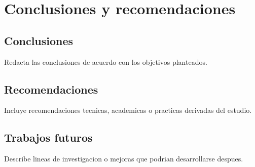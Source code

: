 \chapter{Conclusiones y recomendaciones}

\section{Conclusiones}
Redacta las conclusiones de acuerdo con los objetivos planteados.

\section{Recomendaciones}
Incluye recomendaciones tecnicas, academicas o practicas derivadas del estudio.

\section{Trabajos futuros}
Describe lineas de investigacion o mejoras que podrian desarrollarse despues.
